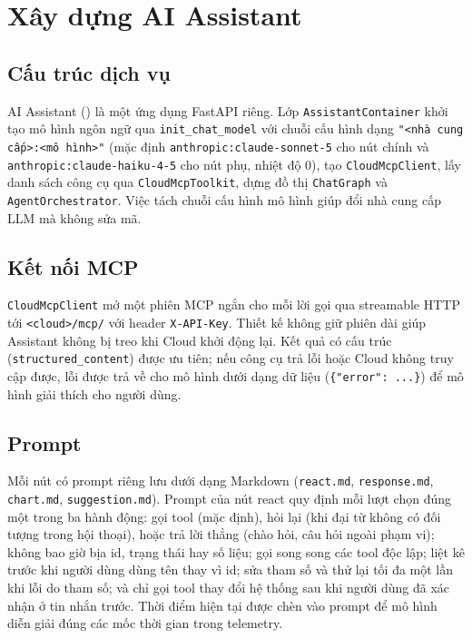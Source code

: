 \section{Xây dựng AI Assistant}

\subsection{Cấu trúc dịch vụ}

AI Assistant () là một ứng dụng FastAPI riêng. Lớp
\texttt{AssistantContainer} khởi tạo mô hình ngôn ngữ qua
\texttt{init\_chat\_model} với chuỗi cấu hình dạng
\texttt{"<nhà cung cấp>:<mô hình>"} (mặc định \texttt{anthropic:claude-sonnet-5}
cho nút chính và \texttt{anthropic:claude-haiku-4-5} cho nút phụ, nhiệt độ 0), tạo
\texttt{CloudMcpClient}, lấy danh sách công cụ qua \texttt{CloudMcpToolkit}, dựng
đồ thị \texttt{ChatGraph} và \texttt{AgentOrchestrator}. Việc tách chuỗi cấu hình
mô hình giúp đổi nhà cung cấp LLM mà không sửa mã.

\subsection{Kết nối MCP}

\texttt{CloudMcpClient} mở một phiên MCP ngắn cho mỗi lời gọi qua streamable
HTTP tới \texttt{<cloud>/mcp/} với header \texttt{X-API-Key}. Thiết kế không giữ
phiên dài giúp Assistant không bị treo khi Cloud khởi động lại. Kết quả có cấu
trúc (\texttt{structured\_content}) được ưu tiên; nếu công cụ trả lỗi hoặc Cloud
không truy cập được, lỗi được trả về cho mô hình dưới dạng dữ liệu
(\texttt{\{"error": ...\}}) để mô hình giải thích cho người dùng.

\subsection{Prompt}

Mỗi nút có prompt riêng lưu dưới dạng Markdown (\texttt{react.md},
\texttt{response.md}, \texttt{chart.md}, \texttt{suggestion.md}). Prompt của nút
react quy định mỗi lượt chọn đúng một trong ba hành động: gọi tool (mặc định),
hỏi lại (khi đại từ không có đối tượng trong hội thoại), hoặc trả lời thẳng (chào
hỏi, câu hỏi ngoài phạm vi); không bao giờ bịa id, trạng thái hay số liệu; gọi
song song các tool độc lập; liệt kê trước khi người dùng dùng tên thay vì id; sửa
tham số và thử lại tối đa một lần khi lỗi do tham số; và chỉ gọi tool thay đổi hệ
thống sau khi người dùng đã xác nhận ở tin nhắn trước. Thời điểm hiện tại được
chèn vào prompt để mô hình diễn giải đúng các mốc thời gian trong telemetry.

